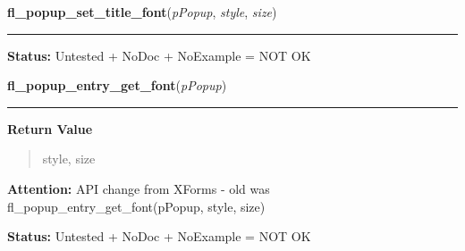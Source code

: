     \label{xformslib:library:fl_popup_set_title_font}

    \vspace{0.5ex}

\hspace{.8\funcindent}\begin{boxedminipage}{\funcwidth}

    \raggedright \textbf{fl\_popup\_set\_title\_font}(\textit{pPopup}, \textit{style}, \textit{size})

    \vspace{-1.5ex}

    \rule{\textwidth}{0.5\fboxrule}
\setlength{\parskip}{2ex}
\setlength{\parskip}{1ex}
\textbf{Status:} Untested + NoDoc + NoExample = NOT OK



    \end{boxedminipage}

    \label{xformslib:library:fl_popup_entry_get_font}

    \vspace{0.5ex}

\hspace{.8\funcindent}\begin{boxedminipage}{\funcwidth}

    \raggedright \textbf{fl\_popup\_entry\_get\_font}(\textit{pPopup})

    \vspace{-1.5ex}

    \rule{\textwidth}{0.5\fboxrule}
\setlength{\parskip}{2ex}
\setlength{\parskip}{1ex}
      \textbf{Return Value}
    \vspace{-1ex}

      \begin{quote}
      style, size

      \end{quote}

\textbf{Attention:} API change from XForms - old was fl\_popup\_entry\_get\_font(pPopup, style,
size)



\textbf{Status:} Untested + NoDoc + NoExample = NOT OK



    \end{boxedminipage}

